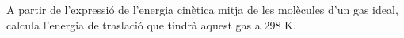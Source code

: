 \begin{exr}{}
A partir de l'expressió de l'energia cinètica mitja de les molècules d'un gas ideal, calcula l'energia de traslació que tindrà aquest gas a 298 K.
\end{exr}

